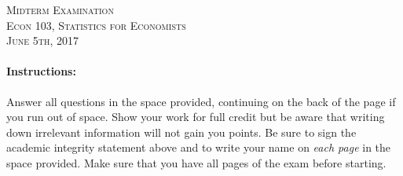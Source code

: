 \documentclass[addpoints,12pt]{exam}
\begin{document}
\begin{center}
\textsc{\Large Midterm Examination\\ \vspace{0.2in} \normalsize Econ 103, Statistics for Economists \\ \vspace{0.5em} June 5th, 2017}

\vspace{2em}



\end{center}


\vspace{2em}
\begin{center}
\end{center}
\vspace{0.2in}

\vspace{0.2in}

\noindent{}

\vspace{0.2in}


\vspace{2em}

\begin{center}
  \gradetable[h][questions]
\end{center}

\vspace{2em}

\paragraph{Instructions:} Answer all questions in the space provided, continuing on the back of the page if you run out of space. Show your work for full credit but be aware that writing down irrelevant information will not gain you points. Be sure to sign the academic integrity statement above and to write your name on \emph{each page} in the space provided. Make sure that you have all pages of the exam before starting.
\end{document}

